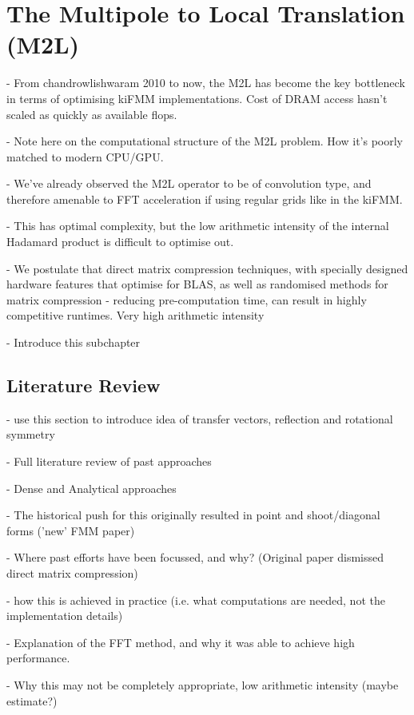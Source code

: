 
\section{The Multipole to Local Translation (M2L)}\label{chpt:field_translation:sec:m2l}

- From chandrowlishwaram 2010 to now, the M2L has become the key bottleneck in terms of optimising kiFMM implementations. Cost of DRAM access hasn't scaled as quickly as available flops.

- Note here on the computational structure of the M2L problem. How it's poorly matched to modern CPU/GPU.

- We've already observed the M2L operator to be of convolution type, and therefore amenable to FFT acceleration if using regular grids like in the kiFMM.

- This has optimal complexity, but the low arithmetic intensity of the internal Hadamard product is difficult to optimise out.

- We postulate that direct matrix compression techniques, with specially designed hardware features that optimise for BLAS, as well as randomised methods for matrix compression - reducing pre-computation time, can result in highly competitive runtimes. Very high arithmetic intensity

- Introduce this subchapter

\subsection{Literature Review}

- use this section to introduce idea of transfer vectors, reflection and rotational symmetry

- Full literature review of past approaches

- Dense and Analytical approaches

- The historical push for this originally resulted in point and shoot/diagonal forms ('new' FMM paper)

- Where past efforts have been focussed, and why? (Original paper dismissed direct matrix compression)

- how this is achieved in practice (i.e. what computations are needed, not the implementation details)

- Explanation of the FFT method, and why it was able to achieve high performance.

- Why this may not be completely appropriate, low arithmetic intensity (maybe estimate?)

